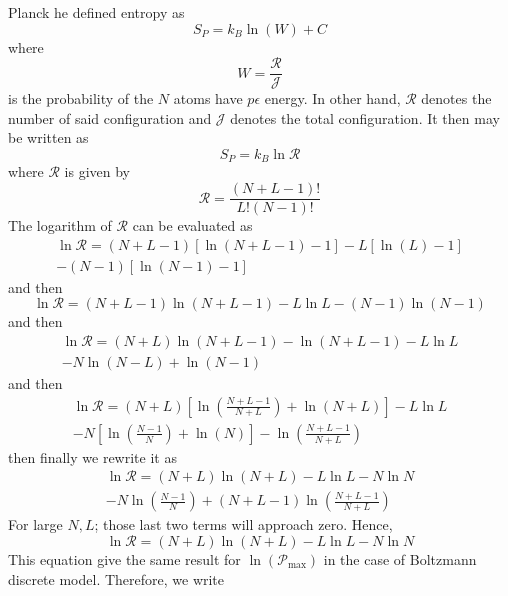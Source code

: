 \documentclass[../../../Main.tex]{subfiles}
\begin{document}
Planck he defined entropy as 
\begin{equation*}
    S_P=k_B\ln (W)+C
\end{equation*}
where
\begin{equation*}
    W=\frac{\mathcal{R}}{\mathcal{J}}
\end{equation*}
is the probability of the $N$ atoms have $p\epsilon$ energy. In other hand, $\mathcal{R}$ denotes the number of said configuration and $\mathcal{J}$ denotes the total configuration. It then may be written as
\begin{equation*}
    S_P=k_B\ln \mathcal{R}
\end{equation*}
where $\mathcal{R}$ is given by 
\begin{equation*}
    \mathcal{R}=\frac{(N+L-1)!}{L!(N-1)!}
\end{equation*}
The logarithm of $\mathcal{R}$ can be evaluated as
\begin{multline*}
    \ln \mathcal{R}=(N+L-1)[\ln (N+L-1)-1]-L[\ln (L)-1]\\
    -(N-1)[\ln(N-1)-1]
\end{multline*}
and then
\begin{equation*}
    \ln \mathcal{R}=(N+L-1)\ln(N+L-1)-L\ln L-(N-1)\ln(N-1)
\end{equation*}
and then 
\begin{multline*}
    \ln \mathcal{R}=(N+L)\ln(N+L-1)-\ln(N+L-1)-L\ln L \\
    -N\ln(N-L)+\ln(N-1)
\end{multline*}
and then 
\begin{multline*}
    \ln \mathcal{R}=(N+L)\left[\ln\left(\frac{N+L-1}{N+L}\right) +\ln\left(N+L\right)\right]-L\ln L \\
    -N\left[\ln \left(\frac{N-1}{N}\right)+\ln (N)\right]-\ln\left(\frac{N+L-1}{N+L}\right)
\end{multline*}
then finally we rewrite it as
\begin{multline*}
    \ln \mathcal{R}=(N+L)\ln(N+L) -L\ln L - N\ln N \\
    -N\ln\left(\frac{N-1}{N}\right) +(N+L-1)\ln\left(\frac{N+L-1}{N+L}\right)
\end{multline*}
For large $N,L$; those last two terms will approach zero. Hence,
\begin{equation*}
    \ln \mathcal{R}=(N+L)\ln(N+L) -L\ln L - N\ln N 
\end{equation*}
This equation give the same result for $\ln(\mathcal{P}_\text{max})$ in the case of Boltzmann discrete model. Therefore, we write 
\end{document}
